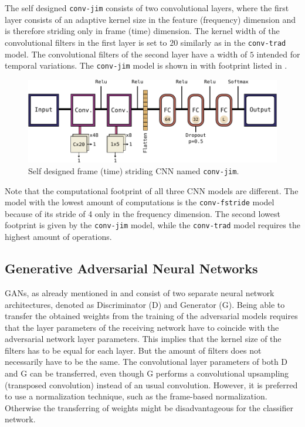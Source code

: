 The self designed \texttt{conv-jim} consists of two convolutional layers, where the first layer consists of an adaptive kernel size in the feature (frequency) dimension and is therefore striding only in frame (time) dimension.
The kernel width of the convolutional filters in the first layer is set to $20$ similarly as in the \texttt{conv-trad} model.
The convolutional filters of the second layer have a width of $5$ intended for temporal variations.
The \texttt{conv-jim} model is shown in  with footprint listed in .
\begin{figure}[!ht]
  \centering
    \includegraphics[height=0.2\textwidth]{./4_nn/figs/nn_arch_cnn_jim.pdf}
  \caption{Self designed frame (time) striding CNN named \texttt{conv-jim}.}
  \label{fig:nn_arch_cnn_jim}
\end{figure}
\FloatBarrier
\noindent


Note that the computational footprint of all three CNN models are different.
The model with the lowest amount of computations is the \texttt{conv-fstride} model because of its stride of 4 only in the frequency dimension.
The second lowest footprint is given by the \texttt{conv-jim} model, while the \texttt{conv-trad} model requires the highest amount of operations.



\subsection{Generative Adversarial Neural Networks}\label{sec:nn_arch_adv}
GANs, as already mentioned in  and  consist of two separate neural network architectures, denoted as Discriminator (D) and Generator (G).
Being able to transfer the obtained weights from the training of the adversarial models requires that the layer parameters of the receiving network have to coincide with the adversarial network layer parameters.
This implies that the kernel size of the filters has to be equal for each layer.
But the amount of filters does not necessarily have to be the same.
The convolutional layer parameters of both D and G can be transferred, even though G performs a convolutional upsampling (transposed convolution) instead of an usual convolution.
However, it is preferred to use a normalization technique, such as the frame-based normalization. 
Otherwise the transferring of weights might be disadvantageous for the classifier network.

